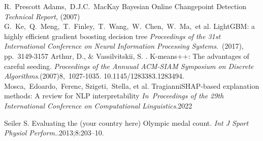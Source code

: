\documentclass[12pt]{article}  %
\begin{document}
\begin{thebibliography}{99}
R. Prescott Adams, D.J.C. MacKay Bayesian Online Changepoint Detection 
\emph{Technical Report}, (2007)
G. Ke, Q. Meng, T. Finley, T. Wang, W. Chen, W. Ma, et al.
LightGBM: a highly efficient gradient boosting decision tree
\emph{Proceedings of the 31st International Conference on Neural Information Processing Systems}. (2017), pp. 3149-3157
Arthur, D., \& Vassilvitskii, S. . K-means++: The advantages of careful seeding.
\emph{Proceedings of the Annuual ACM-SIAM Symposium on Discrete Algorithms}.(2007)8, 1027-1035. 10.1145/1283383.1283494.
Mosca, Edoardo, Ferenc, Szigeti, Stella, et al.
TragianniSHAP-based explanation methods: A review for NLP interpretability
\emph{In Proceedings of the 29th International Conference on Computational Linguistics}.2022

Seiler S. Evaluating the (your country here) Olympic medal count.
\emph{Int J Sport Physiol Perform.}.2013;8:203–10.




\end{thebibliography}
\end{document}
